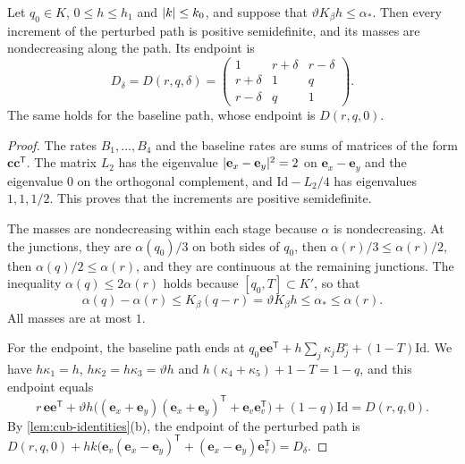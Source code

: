 \begin{lemma}\label{lem:cub-path}
Let $q_0\in K$, $0\le h\le h_1$ and $\lvert k\rvert\le k_0$, and suppose that
$\vartheta K_\beta h\le\alpha_*$. Then every increment of the perturbed path is
positive semidefinite, and its masses are nondecreasing along the path. Its
endpoint is
\begin{equation}\label{b:eq:os-target}
 D_\delta=D(r,q,\delta)=\begin{pmatrix}
 1&r+\delta&r-\delta\\r+\delta&1&q\\r-\delta&q&1
 \end{pmatrix}.
\end{equation}
The same holds for the baseline path, whose endpoint is $D(r,q,0)$.
\end{lemma}

\begin{proof}
The rates $B_1,\dots,B_4$ and the baseline rates are sums of matrices of the
form $\mathbf c\mathbf c^{\mathsf T}$. The matrix $L_2$ has the eigenvalue
$\lvert \mathbf e_x-\mathbf e_y\rvert^2=2$ on $\mathbf e_x-\mathbf e_y$ and the
eigenvalue $0$ on the orthogonal complement, and $\mathrm{Id}-L_2/4$ has eigenvalues
$1,1,1/2$. This proves that the increments are positive semidefinite.

The masses are nondecreasing within each stage because $\alpha$ is
nondecreasing. At the junctions, they are $\alpha(q_0)/3$ on both sides of
$q_0$, then $\alpha(r)/3\le\alpha(r)/2$, then $\alpha(q)/2\le\alpha(r)$, and
they are continuous at the remaining junctions. The inequality
$\alpha(q)\le2\alpha(r)$ holds because $[q_0,T]\subset K'$, so that
\[
 \alpha(q)-\alpha(r)\le K_\beta(q-r)=\vartheta K_\beta h\le\alpha_*\le\alpha(r).
\]
All masses are at most $1$.

For the endpoint, the baseline path ends at
$q_0\mathbf e\mathbf e^{\mathsf T}+h\sum_j\kappa_jB_j^\circ+(1-T)\mathrm{Id}$. We have
$h\kappa_1=h$, $h\kappa_2=h\kappa_3=\vartheta h$ and
$h(\kappa_4+\kappa_5)+1-T=1-q$, and this endpoint equals
\[
 r\,\mathbf e\mathbf e^{\mathsf T}
 +\vartheta h\bigl((\mathbf e_x+\mathbf e_y)(\mathbf e_x+\mathbf e_y)^{\mathsf T}
 +\mathbf e_v\mathbf e_v^{\mathsf T}\bigr)+(1-q)\mathrm{Id}=D(r,q,0).
\]
By \cref{lem:cub-identities}(b), the endpoint of the perturbed path is
$D(r,q,0)+hk\bigl(\mathbf e_v(\mathbf e_x-\mathbf e_y)^{\mathsf T}
+(\mathbf e_x-\mathbf e_y)\mathbf e_v^{\mathsf T}\bigr)=D_\delta$.
\end{proof}

